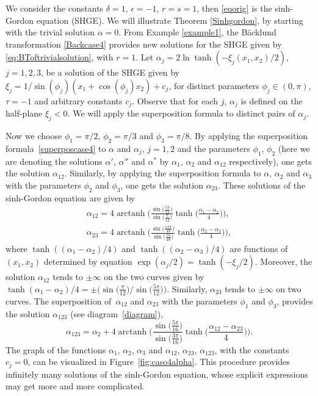 \documentclass[pdftex]{sigma}
\numberwithin{equation}{section}
\begin{document}
\begin{Example}\label{example2}
 We consider the constants $\delta=1$, $\epsilon=-1$, $r=s=1$,
then \eqref{eqorig} is the sinh-Gordon equation (SHGE). We will illustrate Theorem \ref{Sinhgordon}, by starting with the trivial solution $\alpha=0$. From Example \ref{example1}, the B\"acklund transformation \eqref{Backcase4} provides new solutions for the SHGE given by \eqref{eq:BToftrivialsolution}, with $r=1$.
 Let $\alpha_j=2\ln \tanh(-\xi_j(x_1,x_2)/2)$, $j=1,2,3$, be a solution of the SHGE given by
$\xi_j=1/\sin(\phi_j)(x_1+\cos(\phi_j)x_2)+c_j$, for distinct parameters $\phi_j\in(0,\pi)$, $\tau=-1$ and arbitrary constants $c_j$.
Observe that for each $j$, $\alpha_j$ is defined on the half-plane $\xi_j<0$. We will apply the superposition formula to distinct pairs of $\alpha_j$.

Now we choose $\phi_1=\pi/2$, $\phi_2=\pi/3$ and $\phi_3=\pi/8$. By applying
the superposition formula~\eqref{superposcase4} to $\alpha$ and $\alpha_j$, $j=1,2$ and the parameters $\phi_1$, $\phi_2$ (here we are denoting the solutions $\alpha'$, $\alpha''$ and $\alpha^*$ by $\alpha_1$, $\alpha_2$ and $\alpha_{12}$ respectively), one gets the solution
$\alpha_{12}$.
Similarly, by applying the superposition formula to $\alpha$, $\alpha_2$ and $\alpha_3$ with the parameters $\phi_2$ and $\phi_3$, one gets the solution $\alpha_{23}$. These solutions of the sinh-Gordon equation are given by
\begin{gather*}
\alpha_{12}=4\operatorname{arctanh}\Biggl(\frac{\sin\bigl(\frac{5\pi}{12}\bigr)}{\sin\bigl(\frac{\pi}{12}\bigr)}
\tanh\biggl(\frac{\alpha_1-\alpha_2}{4}\biggr)\Biggr),
\\
\alpha_{23}=4\operatorname{arctanh}\Biggl(\frac{\sin\bigl(\frac{11\pi}{48}\bigr)}{\sin\bigl(\frac{5\pi}{48}\bigr)}
\tanh\biggl(\frac{\alpha_2-\alpha_3}{4}\biggr)\Biggr),
\end{gather*}
 where $\tanh((\alpha_1-\alpha_2)/{4})$ and $\tanh((\alpha_2-\alpha_3)/{4})$ are functions of $(x_1,x_2)$ determined by equation $\exp(\alpha_j/2)=\tanh(-\xi_j/2)$. Moreover, the solution $\alpha_{12}$ tends to $\pm \infty$ on the two curves given by $\tanh(\alpha_1-\alpha_2)/4=\pm \bigl(\sin\bigl(\frac{\pi}{12}\bigr)/\sin\bigl(\frac{5\pi}{12}\bigr)\bigr)$. Similarly, $\alpha_{23}$ tends to $\pm \infty$ on two curves. The superposition of~$\alpha_{12}$ and $\alpha_{23}$ with the parameters $\phi_1$ and $\phi_3$, provides the solution $\alpha_{123}$ (see diagram~\eqref{diagram}),
\[
\alpha_{123}= \alpha_2 + 4\operatorname{arctanh}\Biggl(\frac{\sin\bigl(\frac{5\pi}{16}\bigr)}{\sin\bigl(\frac{3\pi}{16}\bigr)}
\tanh\biggl(\frac{\alpha_{12}-\alpha_{23}}{4}\biggr)\Biggr).
\]
The graph of the functions $\alpha_1$, $\alpha_2$, $\alpha_3$ and $\alpha_{12}$, $\alpha_{23}$, $\alpha_{123}$, with the constants $c_j=0$, can be visualized in Figure~\ref{fig:caso4alpha}.
This procedure provides infinitely many solutions of the sinh-Gordon equation, whose explicit expressions may get more and more complicated.



\end{Example}
\end{document}
